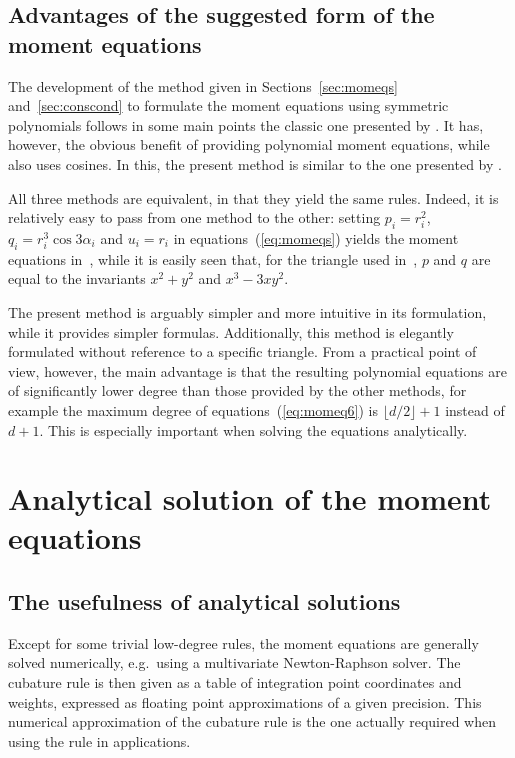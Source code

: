 \documentclass{article}
\begin{document}
\subsection{Advantages of the suggested form of the moment equations}

The development of the method given in Sections~\ref{sec:momeqs} and~\ref{sec:conscond} to formulate the moment equations using symmetric polynomials follows in some main points the classic one presented by \citet{LynessJespersen1975}. It has, however, the obvious benefit of providing polynomial moment equations, while~\citep{LynessJespersen1975} also uses cosines. In this, the present method is similar to the one presented by \citet{WandzuraXiao2003}.

All three methods  are equivalent, in that they yield the same rules. Indeed, it is relatively easy to pass from one method to the other: setting $p_i = r_i^2$, $q_i = r_i^3 \cos 3 \alpha_i$ and $u_i = r_i$ in equations~(\ref{eq:momeqs}) yields the moment equations in~\citep{LynessJespersen1975}, while it is easily seen that, for the triangle used in~\citep{WandzuraXiao2003}, $p$ and $q$ are equal to the invariants $x^2+y^2$ and $x^3-3 x y^2$.

The present method is arguably simpler and more intuitive in its formulation, while it provides simpler formulas. Additionally, this method is elegantly formulated without reference to a specific triangle. From a practical point of view, however, the main advantage is that the resulting polynomial equations are of significantly lower degree than those provided by the other methods, for example the maximum degree of equations~(\ref{eq:momeq6}) is $\lfloor d/2 \rfloor + 1$ instead of $d+1$. This is especially important when solving the equations analytically.




\section{Analytical solution of the moment equations}
\label{sec:analytsol}





\subsection{The usefulness of analytical solutions}

Except for some trivial low-degree rules, the moment equations are generally solved numerically, e.g.\ using a multivariate Newton-Raphson solver. The cubature rule is then given as a table of integration point coordinates and weights, expressed as floating point approximations of a given precision. This numerical approximation of the cubature rule is the one actually required when using the rule in applications.
\end{document}
